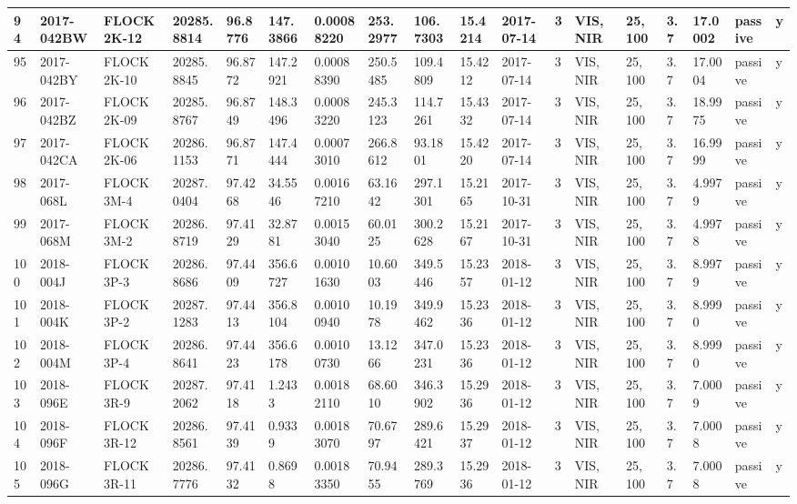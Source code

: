 \documentclass[12pt,a4paper,notitlepage,twoside,openright]{report}
\begin{document}
\begin{longtable}{|l|l|l|l|l|l|l|l|l|l|l|l|l|l|l|l|l|l|}
        94 & 2017-042BW & FLOCK 2K-12 & 20285.8814 & 96.8776 & 147.3866 & 0.00088220 & 253.2977 & 106.7303 & 15.4214 & 2017-07-14 & 3 & VIS, NIR & 25, 100 & 3.7 & 17.0002 & passive & y \\ \hline
        95 & 2017-042BY & FLOCK 2K-10 & 20285.8845 & 96.8772 & 147.2921 & 0.00088390 & 250.5485 & 109.4809 & 15.4212 & 2017-07-14 & 3 & VIS, NIR & 25, 100 & 3.7 & 17.0004 & passive & y \\ \hline
        96 & 2017-042BZ & FLOCK 2K-09 & 20285.8767 & 96.8749 & 148.3496 & 0.00083220 & 245.3123 & 114.7261 & 15.4332 & 2017-07-14 & 3 & VIS, NIR & 25, 100 & 3.7 & 18.9975 & passive & y \\ \hline
        97 & 2017-042CA & FLOCK 2K-06 & 20286.1153 & 96.8771 & 147.4444 & 0.00073010 & 266.8612 & 93.1801 & 15.4220 & 2017-07-14 & 3 & VIS, NIR & 25, 100 & 3.7 & 16.9999 & passive & y \\ \hline
        98 & 2017-068L & FLOCK 3M-4 & 20287.0404 & 97.4268 & 34.5546 & 0.00167210 & 63.1642 & 297.1301 & 15.2165 & 2017-10-31 & 3 & VIS, NIR & 25, 100 & 3.7 & 4.9979 & passive & y \\ \hline
        99 & 2017-068M & FLOCK 3M-2 & 20286.8719 & 97.4129 & 32.8781 & 0.00153040 & 60.0125 & 300.2628 & 15.2167 & 2017-10-31 & 3 & VIS, NIR & 25, 100 & 3.7 & 4.9978 & passive & y \\ \hline
        100 & 2018-004J & FLOCK 3P-3 & 20286.8686 & 97.4409 & 356.6727 & 0.00101630 & 10.6003 & 349.5446 & 15.2357 & 2018-01-12 & 3 & VIS, NIR & 25, 100 & 3.7 & 8.9979 & passive & y \\ \hline
        101 & 2018-004K & FLOCK 3P-2 & 20287.1283 & 97.4413 & 356.8104 & 0.00100940 & 10.1978 & 349.9462 & 15.2336 & 2018-01-12 & 3 & VIS, NIR & 25, 100 & 3.7 & 8.9990 & passive & y \\ \hline
        102 & 2018-004M & FLOCK 3P-4 & 20286.8641 & 97.4423 & 356.6178 & 0.00100730 & 13.1266 & 347.0231 & 15.2336 & 2018-01-12 & 3 & VIS, NIR & 25, 100 & 3.7 & 8.9990 & passive & y \\ \hline
        103 & 2018-096E & FLOCK 3R-9 & 20287.2062 & 97.4118 & 1.2433 & 0.00182110 & 68.6010 & 346.3902 & 15.2936 & 2018-01-12 & 3 & VIS, NIR & 25, 100 & 3.7 & 7.0009 & passive & y \\ \hline
        104 & 2018-096F & FLOCK 3R-12 & 20286.8561 & 97.4139 & 0.9339 & 0.00183070 & 70.6797 & 289.6421 & 15.2937 & 2018-01-12 & 3 & VIS, NIR & 25, 100 & 3.7 & 7.0008 & passive & y \\ \hline
        105 & 2018-096G & FLOCK 3R-11 & 20286.7776 & 97.4132 & 0.8698 & 0.00183350 & 70.9455 & 289.3769 & 15.2936 & 2018-01-12 & 3 & VIS, NIR & 25, 100 & 3.7 & 7.0008 & passive & y \\ \hline

\end{longtable}
\end{document}
